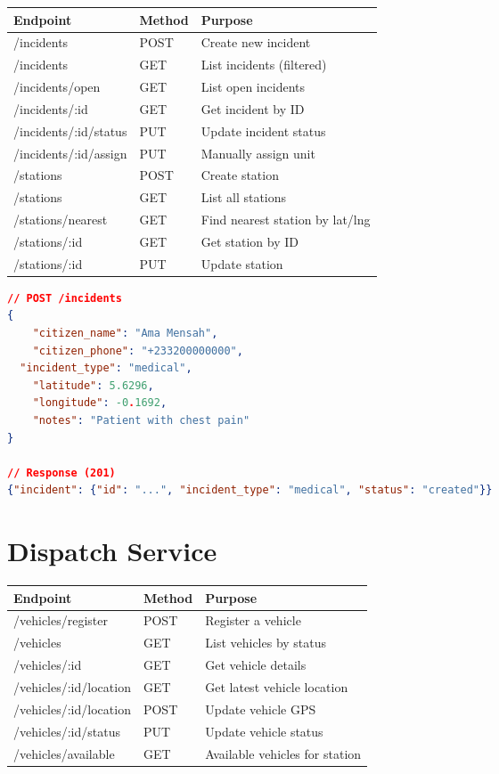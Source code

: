 \documentclass[12pt,a4paper]{report}
\begin{document}
\begin{table}[H]
\centering\small
\begin{tabular}{|l|l|p{7cm}|}
\hline
\textbf{Endpoint} & \textbf{Method} & \textbf{Purpose} \\
\hline
/incidents & POST & Create new incident \\
\hline
/incidents & GET & List incidents (filtered) \\
\hline
/incidents/open & GET & List open incidents \\
\hline
/incidents/:id & GET & Get incident by ID \\
\hline
/incidents/:id/status & PUT & Update incident status \\
\hline
/incidents/:id/assign & PUT & Manually assign unit \\
\hline
/stations & POST & Create station \\
\hline
/stations & GET & List all stations \\
\hline
/stations/nearest & GET & Find nearest station by lat/lng \\
\hline
/stations/:id & GET & Get station by ID \\
\hline
/stations/:id & PUT & Update station \\
\hline
\end{tabular}
\end{table}

\begin{lstlisting}[language=JSON, caption=Create Incident]
// POST /incidents
{
	"citizen_name": "Ama Mensah",
	"citizen_phone": "+233200000000",
  "incident_type": "medical",
	"latitude": 5.6296,
	"longitude": -0.1692,
	"notes": "Patient with chest pain"
}

// Response (201)
{"incident": {"id": "...", "incident_type": "medical", "status": "created"}}
\end{lstlisting}

\section{Dispatch Service}

\begin{table}[H]
\centering\small
\begin{tabular}{|l|l|p{7cm}|}
\hline
\textbf{Endpoint} & \textbf{Method} & \textbf{Purpose} \\
\hline
/vehicles/register & POST & Register a vehicle \\
\hline
/vehicles & GET & List vehicles by status \\
\hline
/vehicles/:id & GET & Get vehicle details \\
\hline
/vehicles/:id/location & GET & Get latest vehicle location \\
\hline
/vehicles/:id/location & POST & Update vehicle GPS \\
\hline
/vehicles/:id/status & PUT & Update vehicle status \\
\hline
/vehicles/available & GET & Available vehicles for station \\
\hline
\end{tabular}
\end{table}
\end{document}
